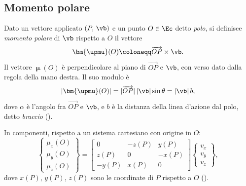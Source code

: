 \subsection{Momento polare}\label{sec:momento_polare}

Dato un vettore applicato $(P,\,\vb)$ e un punto $O \in \Ec$ detto
\textit{polo}, si definisce \textit{momento polare} di $\vb$ rispetto
a $O$ il vettore
\begin{equation}\label{eq:momento_polare}
	\bm{\upmu}(O) \coloneqq \overrightarrow{OP} \times \vb.
\end{equation}
Il vettore $\bm{\upmu}(O)$ è perpendicolare al piano di
$\overrightarrow{OP}$ e $\vb$, con verso dato dalla regola della mano
destra. Il suo modulo è
\begin{equation}
	|\bm{\upmu}(O)| = |\overrightarrow{OP}|\,|\vb|\sin\theta = |\vb|\,b,
\end{equation}
dove $\alpha$ è l'angolo fra $\overrightarrow{OP}$ e $\vb$, e $b$ è la
distanza della linea d'azione dal polo, detto \textit{braccio}
().






In componenti, rispetto a un sistema cartesiano con origine in $O$:
\begin{equation}\label{eq:momento_matrice}
	\begin{Bmatrix} \mu_x(O) \\ \mu_y(O) \\ \mu_z(O) \end{Bmatrix}
	=
	\begin{bmatrix}
		0    & -z(P) &  y(P) \\
		z(P) &  0    & -x(P) \\
		-y(P) &  x(P) &  0
	\end{bmatrix}
	\begin{Bmatrix} v_x \\ v_y \\ v_z \end{Bmatrix},
\end{equation}
dove $x(P)$, $y(P)$, $z(P)$ sono le coordinate di $P$ rispetto a $O$ ().







